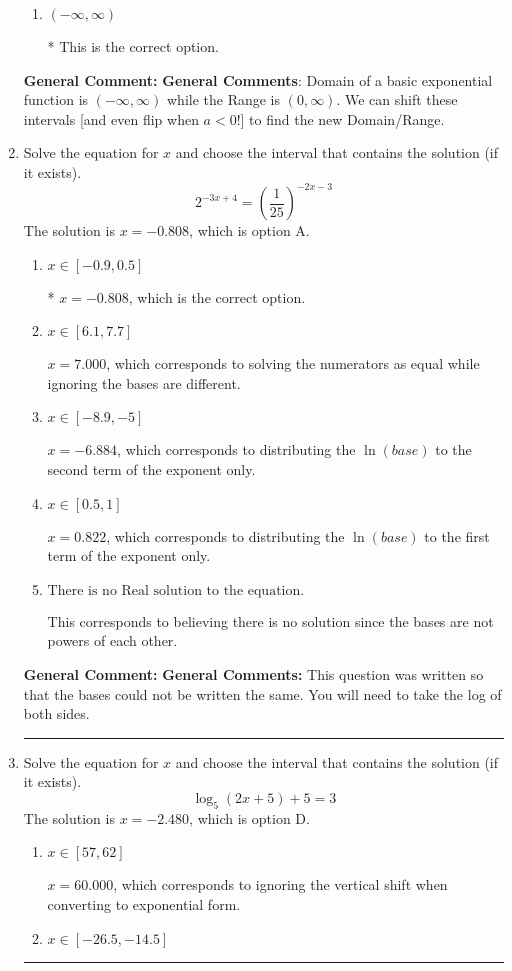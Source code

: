 \documentclass{extbook}[14pt]
\newcommand{\litem}[1]{\item #1

\rule{\textwidth}{0.4pt}}
\begin{document}
\begin{enumerate}
{\begin{enumerate}[label=\Alph*.]
$[-7, \infty)$, which corresponds to using the negative vertical shift AND flipping the Range interval AND including the endpoint.
\item \( (-\infty, \infty) \)

* This is the correct option.
\end{enumerate}

\textbf{General Comment:} \textbf{General Comments}: Domain of a basic exponential function is $(-\infty, \infty)$ while the Range is $(0, \infty)$. We can shift these intervals [and even flip when $a<0$!] to find the new Domain/Range.
}
\litem{
Solve the equation for $x$ and choose the interval that contains the solution (if it exists).
\[ 2^{-3x+4} = \left(\frac{1}{25}\right)^{-2x-3} \]The solution is \( x = -0.808 \), which is option A.\begin{enumerate}[label=\Alph*.]
\item \( x \in [-0.9, 0.5] \)

* $x = -0.808$, which is the correct option.
\item \( x \in [6.1, 7.7] \)

$x = 7.000$, which corresponds to solving the numerators as equal while ignoring the bases are different.
\item \( x \in [-8.9, -5] \)

$x = -6.884$, which corresponds to distributing the $\ln(base)$ to the second term of the exponent only.
\item \( x \in [0.5, 1] \)

$x = 0.822$, which corresponds to distributing the $\ln(base)$ to the first term of the exponent only.
\item \( \text{There is no Real solution to the equation.} \)

This corresponds to believing there is no solution since the bases are not powers of each other.
\end{enumerate}

\textbf{General Comment:} \textbf{General Comments:} This question was written so that the bases could not be written the same. You will need to take the log of both sides.
}
\litem{
Solve the equation for $x$ and choose the interval that contains the solution (if it exists).
\[ \log_{5}{(2x+5)}+5 = 3 \]The solution is \( x = -2.480 \), which is option D.\begin{enumerate}[label=\Alph*.]
\item \( x \in [57, 62] \)

$x = 60.000$, which corresponds to ignoring the vertical shift when converting to exponential form.
\item \( x \in [-26.5, -14.5] \)


\end{enumerate}}
\end{enumerate}
\end{document}
